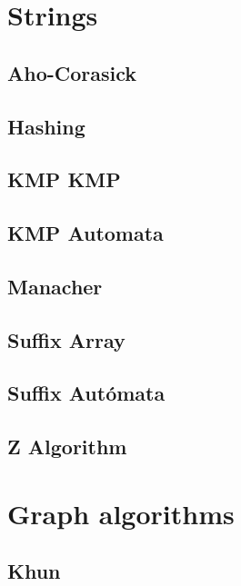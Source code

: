 \section{Strings}
\subsection{Aho-Corasick}
\raggedbottom
\hrulefill
\subsection{	Hashing}
\raggedbottom
\hrulefill
\subsection{KMP		KMP}
\raggedbottom
\hrulefill
\subsection{KMP Automata}
\raggedbottom
\hrulefill
\subsection{Manacher}
\raggedbottom
\hrulefill
\subsection{Suffix Array}
\raggedbottom
\hrulefill
\subsection{Suffix Autómata}
\raggedbottom
\hrulefill
\subsection{   Z Algorithm}
\raggedbottom
\hrulefill

\section{Graph algorithms}
\subsection{   Khun}
\raggedbottom
\hrulefill
